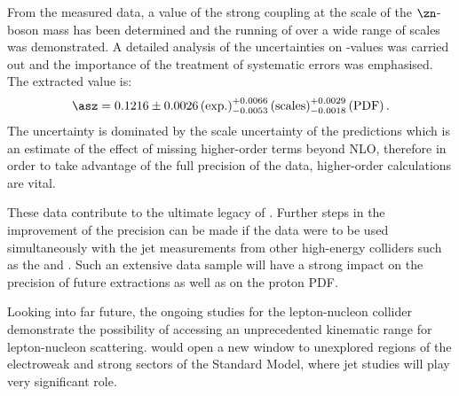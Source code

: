 From the measured data, a value of the strong coupling at the scale of the $\zn$-boson mass has been determined and the running of \as over a wide range of scales was demonstrated. A detailed analysis of the uncertainties on \asz-values was carried out and the importance of the treatment of systematic errors was emphasised. The extracted \asz value is:
\begin{equation}
 \asz = 0.1216 \pm 0.0026\left(\text{exp.}\right)^{+0.0066}_{-0.0053}\left(\text{scales}\right)^{+0.0029}_{-0.0018}\left(\text{PDF}\right).
\end{equation}
The uncertainty is dominated by the scale uncertainty of the predictions which is an estimate of the effect of missing higher-order terms beyond NLO, therefore in order to take advantage of the full precision of the data, higher-order calculations are vital. 

These data contribute to the ultimate legacy of \hera. Further steps in the improvement of the \asz precision can be made if the \hera data were to be used simultaneously with the jet measurements from other high-energy colliders such as the \lhc and \tevatron. Such an extensive data sample will have a strong impact on the precision of future \asz extractions as well as on the proton PDF.

Looking into far future, the ongoing studies for the lepton-nucleon collider \lhec demonstrate the possibility of accessing an unprecedented kinematic range for lepton-nucleon scattering. \lhec would open a new window to unexplored regions of the electroweak and strong sectors of the Standard Model, where jet studies will play very significant role.



